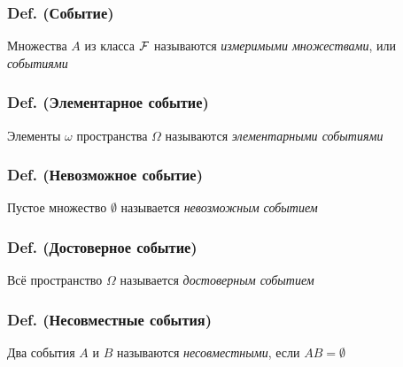 \subsubsection{Def.
(Событие)}\label{def.-ux441ux43eux431ux44bux442ux438ux435}

Множества \(A\) из класса \(\mathcal F\) называются \emph{измеримыми
множествами}, или \emph{событиями}

\subsubsection{Def. (Элементарное
событие)}\label{def.-ux44dux43bux435ux43cux435ux43dux442ux430ux440ux43dux43eux435-ux441ux43eux431ux44bux442ux438ux435}

Элементы \(\omega\) пространства \(\Omega\) называются
\emph{элементарными событиями}

\subsubsection{Def. (Невозможное
событие)}\label{def.-ux43dux435ux432ux43eux437ux43cux43eux436ux43dux43eux435-ux441ux43eux431ux44bux442ux438ux435}

Пустое множество \(\emptyset\) называется \emph{невозможным событием}

\subsubsection{Def. (Достоверное
событие)}\label{def.-ux434ux43eux441ux442ux43eux432ux435ux440ux43dux43eux435-ux441ux43eux431ux44bux442ux438ux435}

Всё пространство \(\Omega\) называется \emph{достоверным событием}

\subsubsection{Def. (Несовместные
события)}\label{def.-ux43dux435ux441ux43eux432ux43cux435ux441ux442ux43dux44bux435-ux441ux43eux431ux44bux442ux438ux44f}

Два события \(A\) и \(B\) называются \emph{несовместными}, если
\(AB = \emptyset\)

